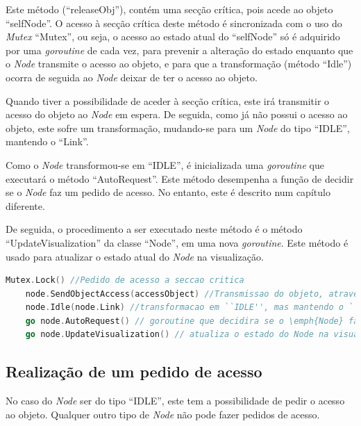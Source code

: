 Este método (``releaseObj''), contém uma secção crítica,
pois acede ao objeto ``selfNode''. 
O acesso à secção crítica deste método é sincronizada com o uso do \emph{Mutex} ``Mutex'', ou seja,
o acesso ao estado atual do ``selfNode'' só é adquirido por uma \emph{goroutine} de cada vez, para prevenir a alteração do estado
enquanto que o \emph{Node} transmite o acesso ao objeto, 
e para que a transformação (método ``Idle'') ocorra de seguida ao \emph{Node} deixar de ter o acesso ao objeto.

Quando tiver a possibilidade de aceder à secção crítica, este irá transmitir o acesso do objeto ao \emph{Node} em espera.
De seguida, como já não possui o acesso ao objeto, este sofre um transformação, mudando-se para um \emph{Node}
do tipo ``IDLE'', mantendo o ``Link''.

Como o \emph{Node} transformou-se em ``IDLE'', é inicializada uma \emph{goroutine} que executará o método ``AutoRequest''.
Este método desempenha a função de decidir se o \emph{Node} faz um pedido de acesso. 
No entanto, este é descrito num capítulo diferente.

De seguida, o procedimento a ser executado neste método é o método ``UpdateVisualization'' da classe ``Node'',
em uma nova \emph{goroutine}.
Este método é usado para atualizar o estado atual do \emph{Node} na visualização.


\begin{lstlisting}[caption={Acesso à secção crítica, transmição do Objeto, transformação em \emph{Node} ``IDLE'', \emph{goroutine} de decisão de pedido, e atualização na visualização},language=Go]
	Mutex.Lock() //Pedido de acesso a seccao critica
	node.SendObjectAccess(accessObject) //Transmissao do objeto, atraves do envio do objeto ``accessObject''
	node.Idle(node.Link) //transformacao em ``IDLE'', mas mantendo o ``Link''
	go node.AutoRequest() // goroutine que decidira se o \emph{Node} faz um pedido de acesso
	go node.UpdateVisualization() // atualiza o estado do Node na visualizacao

\end{lstlisting}


\subsection*{Realização de um pedido de acesso}
No caso do \emph{Node} ser do tipo ``IDLE'', este tem a possibilidade de pedir o acesso ao objeto.
Qualquer outro tipo de \emph{Node} não pode fazer pedidos de acesso.

